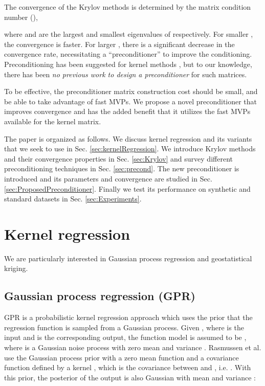 \documentclass[10pt,journal,letterpaper,compsoc]{IEEEtran}
\begin{document}
The convergence of the Krylov methods is determined by the matrix condition number  (),

where  and  are the largest  and smallest eigenvalues of  respectively. For smaller , the convergence is faster. For larger , there is a significant decrease in the convergence rate, necessitating a ``preconditioner'' \cite{SaadIterativeMethods} to improve the conditioning. Preconditioning has been suggested for kernel methods \cite{NandoKrylov,MurrayKrylov}, but to our knowledge, there has been \emph{no previous work to design a preconditioner }for such matrices.

To be effective, the preconditioner matrix construction cost should be small, and be able to take advantage of fast MVPs. We propose a novel preconditioner that improves convergence and has the added benefit that it utilizes the fast MVPs available for the kernel matrix.

The paper is organized as follows. We discuss kernel regression and its variants that we seek to use in Sec. \ref{sec:kernelRegression}. We introduce Krylov methods and their convergence properties in Sec. \ref{sec:Krylov} and survey different preconditioning techniques in Sec. \ref{sec:precond}. The new preconditioner is introduced and its parameters and convergence are studied in Sec. \ref{sec:ProposedPreconditioner}. Finally we test its performance on synthetic and standard datasets in Sec. \ref{sec:Experiments}.

\section{Kernel regression\label{sec:kernelRegression}}
We are particularly interested in Gaussian process regression and geostatistical kriging.

\subsection{Gaussian process regression (GPR) \cite{GPML_Rasmussen} \label{sec:GPR}}
GPR is a probabilistic kernel regression approach which uses the prior that the regression function is sampled from a Gaussian process. Given , where  is the input and  is the corresponding output, the function model is assumed to be , where  is a Gaussian noise process with zero mean and variance . Rasmussen et al. \cite{GPML_Rasmussen} use the Gaussian process prior with a zero mean function and a covariance function defined by a kernel , which is the covariance between  and , i.e. . With this prior, the posterior of the output  is also Gaussian with mean  and variance :
\end{document}
